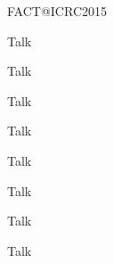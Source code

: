 \documentclass[t]{beamer}
\begin{document}
\begin{columns}[t, onlytextwidth]
\begin{column}{0.15\textwidth}
    \begin{block}[equal height group=bottom]{\normalsize FACT@ICRC2015}
      \begin{multicols}{2}
      \begin{description}[align=right, labelwidth=2cm]
        \item[704] Talk
        \item[706] Talk
        \item[707] Talk
        \item[733] Talk
      \end{description}
      \columnbreak
      \begin{description}[align=right, labelwidth=2cm]
        \item[806] Talk
        \item[976] Talk
        \item[1032] Talk
        \item[Xtalk] Talk
      \end{description}
      \end{multicols}
    \end{block}
  \end{column}%
\end{columns}%
\end{document}
